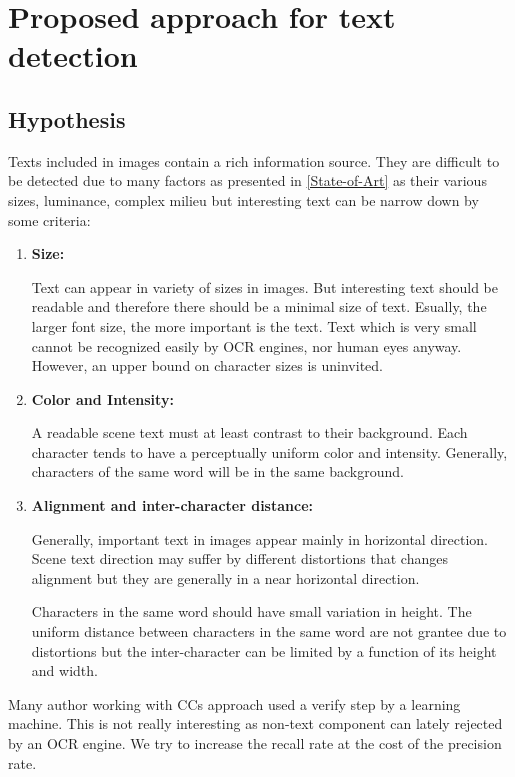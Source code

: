    
\graphicspath{ {4chapterOurApproach/image/} }
\chapter{Proposed approach for text detection} \label{Approach}
\section{Hypothesis}
\par
Texts included in images contain a rich information source. They are difficult to be detected due to many factors as presented in \ref{State-of-Art} as their various sizes, luminance, complex milieu but interesting text can be narrow down by some criteria:
\begin{enumerate}
\item {\textbf{Size:}}
\par
Text can appear in variety of sizes in images. But interesting text should be readable and therefore there should be a minimal size of text. Esually, the larger font size, the more important is the text. Text which is very small cannot be recognized easily by OCR engines, nor human eyes anyway. However, an upper bound on character sizes is uninvited.
\item {\textbf{Color and Intensity:}}
\par
A readable scene text must at least contrast to their background. Each character tends to have a perceptually uniform color and intensity. Generally, characters of the same word will be in the same background.
\item {\textbf{Alignment and inter-character distance:}}
\par
Generally, important text in images appear mainly in horizontal direction. Scene text direction may suffer by different distortions that changes alignment but they are generally in a near horizontal direction. 
\par
Characters in the same word should have small variation in height. The uniform distance between characters in the same word are not grantee due to distortions but the inter-character can be limited by a function of its height and width. 
\end{enumerate}
\par
Many author working with CCs approach used a verify step by a learning machine. This is not really interesting as non-text component can lately rejected by an OCR engine. We try to increase the recall rate at the cost of the precision rate.
